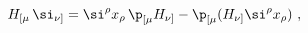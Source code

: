 \begin{equation*}
  H_{[\mu}\, \si_{\nu]} = \si^\rho x_\rho\, \p_{[\mu} H_{\nu]} -
  \p_{[\mu} (H_{\nu]} \si^\rho x_\rho)\ ,
 \end{equation*}

